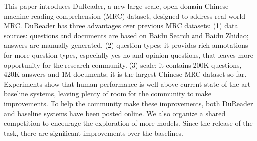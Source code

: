 This paper introduces DuReader, a new large-scale, open-domain Chinese machine reading comprehension (MRC) dataset, designed to address real-world MRC. DuReader has three advantages over previous MRC datasets: (1) data sources: questions and documents are based on Baidu Search and Baidu Zhidao; answers are manually generated. (2) question types: it provides rich annotations for more question types, especially yes-no and opinion questions, that leaves more opportunity for the research community. (3) scale: it contains 200K questions, 420K answers and 1M documents; it is the largest Chinese MRC dataset so far. Experiments show that human performance is well above current state-of-the-art baseline systems, leaving plenty of room for the community to make improvements. To help the community make these improvements, both DuReader and baseline systems have been posted online. We also organize a shared competition to encourage the exploration of more models. Since the release of the task, there are significant improvements over the baselines.
